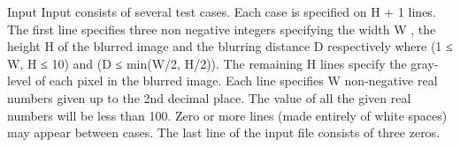 Input
Input consists of several test cases. Each case is specified on H + 1 lines. The first line specifies three non negative integers specifying the width W , the height H of the blurred image and the blurring distance D respectively where (1 ≤ W, H ≤ 10) and (D ≤ min(W/2, H/2)). The remaining H lines specify the gray-level of each pixel in the blurred image. Each line specifies W non-negative real numbers given up to the 2nd decimal place. The value of all the given real numbers will be less than 100. Zero or more lines (made entirely of white spaces) may appear between cases. The last line of the input file consists of three zeros.